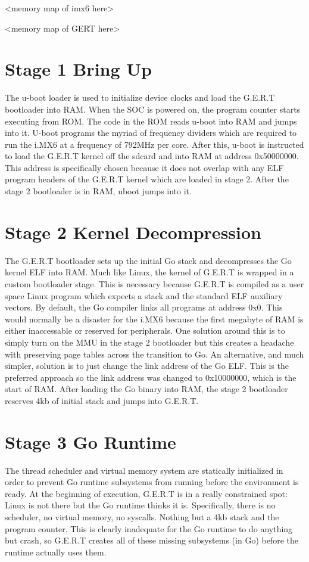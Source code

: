 <memory map of imx6 here>

<memory map of GERT here>

\section{Stage 1 Bring Up}
The u-boot loader is used to initialize device clocks and load the G.E.R.T bootloader into RAM.
When the SOC is powered on, the program counter starts executing from ROM. The code in the ROM reads
u-boot into RAM and jumps into it. U-boot programs the myriad of frequency dividers which are required
to run the i.MX6 at a frequency of 792MHz per core. After this, u-boot is instructed to load the G.E.R.T
kernel off the sdcard and into RAM at address 0x50000000. This address is specifically chosen because it
does not overlap with any ELF program headers of the G.E.R.T kernel which are loaded in stage 2. After
the stage 2 bootloader is in RAM, uboot jumps into it.

\section{Stage 2 Kernel Decompression}
The G.E.R.T bootloader sets up the initial Go stack and decompresses the Go kernel
ELF into RAM. Much like Linux, the kernel of G.E.R.T is wrapped in a custom
bootloader stage. This is necessary because G.E.R.T is compiled as a user space
Linux program which expects a stack and the standard ELF auxiliary vectors. By
default, the Go compiler links all programs at address 0x0. This would normally
be a disaster for the i.MX6 because the first megabyte of RAM is either inaccessable
or reserved for peripherals. One solution around this is to simply turn on the MMU
in the stage 2 bootloader but this creates a headache with preserving page tables
across the transition to Go. An alternative, and much simpler, solution is to
just change the link address of the Go ELF. This is the preferred approach so
the link address was changed to 0x10000000, which is the start of RAM.
After loading the Go binary into RAM, the stage 2 bootloader reserves
4kb of initial stack and jumps into G.E.R.T.

\section{Stage 3 Go Runtime}
The thread scheduler and virtual memory system are statically initialized
in order to prevent Go runtime subsystems from running before the environment
is ready. At the beginning of execution, G.E.R.T is in a really constrained
spot: Linux is not there but the Go runtime thinks it is. Specifically, there
is no scheduler, no virtual memory, no syscalls. Nothing but a 4kb stack
and the program counter. This is clearly inadequate for the Go runtime
to do anything but crash, so G.E.R.T creates all of these missing subsystems
(in Go) before the runtime actually uses them.


